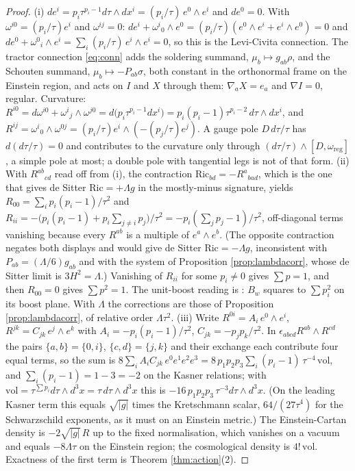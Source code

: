 \documentclass[11pt]{article}
\theoremstyle{definition}
\begin{document}
\begin{proof}
(i) $de^i = p_i\tau^{p_i-1}d\tau\wedge dx^i = (p_i/\tau)\,e^0\wedge e^i$ and $de^0 = 0$. With $\omega^{i0} = (p_i/\tau)e^i$ and $\omega^{ij} = 0$: $de^i + \omega^{i}{}_{0}\wedge e^0 = (p_i/\tau)(e^0\wedge e^i + e^i\wedge e^0) = 0$ and $de^0 + \omega^{0}{}_{i}\wedge e^i = \sum_i (p_i/\tau)\, e^i\wedge e^i = 0$, so this is the Levi-Civita connection. The tractor connection \eqref{eq:conn} adds the soldering summand, $\mu_b \mapsto g_{ab}\rho$, and the Schouten summand, $\mu_b \mapsto -P_{ab}\sigma$, both constant in the orthonormal frame on the Einstein region, and acts on $I$ and $X$ through them: $\nabla_a X = e_a$ and $\nabla I = 0$, regular. Curvature: $R^{i0} = d\omega^{i0} + \omega^{i}{}_{j}\wedge\omega^{j0} = d\bigl(p_i\tau^{p_i-1}dx^i\bigr) = p_i(p_i-1)\tau^{p_i-2}\,d\tau\wedge dx^i$, and $R^{ij} = \omega^{i}{}_{0}\wedge\omega^{0j} = (p_i/\tau)e^i\wedge(-(p_j/\tau)e^j)$. A gauge pole $D\,d\tau/\tau$ has $d(d\tau/\tau) = 0$ and contributes to the curvature only through $(d\tau/\tau)\wedge[D, \omega_{\mathrm{reg}}]$, a simple pole at most; a double pole with tangential legs is not of that form. (ii) With $R^{ab}{}_{cd}$ read off from (i), the contraction $\mathrm{Ric}_{bd} = -R^{a}{}_{bad}$, which is the one that gives de Sitter $\mathrm{Ric} = +\Lambda g$ in the mostly-minus signature, yields $R_{00} = \sum_i p_i(p_i-1)/\tau^2$ and $R_{ii} = -\bigl(p_i(p_i-1) + p_i\sum_{j\neq i}p_j\bigr)/\tau^2 = -p_i(\sum_j p_j - 1)/\tau^2$, off-diagonal terms vanishing because every $R^{ab}$ is a multiple of $e^a\wedge e^b$. (The opposite contraction negates both displays and would give de Sitter $\mathrm{Ric} = -\Lambda g$, inconsistent with $P_{ab} = (\Lambda/6)g_{ab}$ and with the system of Proposition \ref{prop:lambdacorr}, whose de Sitter limit is $3H^2 = \Lambda$.) Vanishing of $R_{ii}$ for some $p_i \neq 0$ gives $\sum p = 1$, and then $R_{00} = 0$ gives $\sum p^2 = 1$. The unit-boost reading is \cite[Prop.~8.26(3)]{ButlerT4}: $B_w$ squares to $\sum p_i^2$ on its boost plane. With $\Lambda$ the corrections are those of Proposition \ref{prop:lambdacorr}, of relative order $\Lambda\tau^2$. (iii) Write $R^{0i} = A_i\,e^0\wedge e^i$, $R^{jk} = C_{jk}\,e^j\wedge e^k$ with $A_i = -p_i(p_i-1)/\tau^2$, $C_{jk} = -p_jp_k/\tau^2$. In $\epsilon_{abcd}R^{ab}\wedge R^{cd}$ the pairs $\{a,b\} = \{0,i\}$, $\{c,d\} = \{j,k\}$ and their exchange each contribute four equal terms, so the sum is $8\sum_i A_iC_{jk}\,e^0e^1e^2e^3 = 8\,p_1p_2p_3\sum_i(p_i - 1)\,\tau^{-4}\,\mathrm{vol}$, and $\sum_i(p_i - 1) = 1 - 3 = -2$ on the Kasner relations; with $\mathrm{vol} = \tau^{\sum p_i}d\tau\wedge d^3x = \tau\,d\tau\wedge d^3x$ this is $-16\,p_1p_2p_3\,\tau^{-3}d\tau\wedge d^3x$. (On the leading Kasner term this equals $\sqrt{|g|}$ times the Kretschmann scalar, $64/(27\tau^4)$ for the Schwarzschild exponents, as it must on an Einstein metric.) The Einstein-Cartan density is $-2\sqrt{|g|}\,R$ up to the fixed normalisation, which vanishes on a vacuum and equals $-8\Lambda\tau$ on the Einstein region; the cosmological density is $4!\,\mathrm{vol}$. Exactness of the first term is Theorem \ref{thm:action}(2).
\end{proof}
\end{document}
